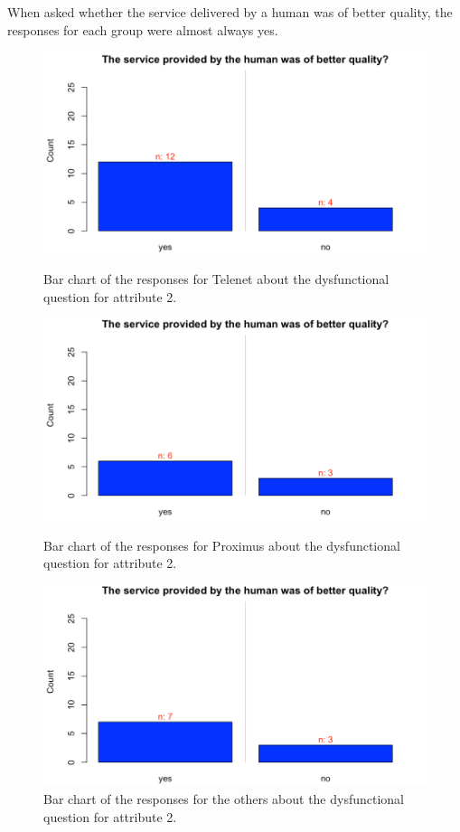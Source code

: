 When asked whether the service delivered by a human was of better quality, the responses for each group were almost always yes.\\
\begin{figure}[!htb]
	\includegraphics[width=\linewidth]{../LaTeX/Figures/Comparative/DQ2T.png}
	\caption{Bar chart of the responses for Telenet about the dysfunctional question for attribute 2.}\label{fig:DQ2T}
	\endminipage\hfill
	\includegraphics[width=\linewidth]{../LaTeX/Figures/Comparative/DQ2P.png}
	\caption{Bar chart of the responses for Proximus about the dysfunctional question for attribute 2.}\label{fig:DQ2P}
	\endminipage\hfill
	\includegraphics[width=\linewidth]{../LaTeX/Figures/Comparative/DQ2O.png}
	\caption{Bar chart of the responses for the others about the dysfunctional question for attribute 2.}\label{fig:DQ2O}
	\endminipage\hfill
\end{figure}
